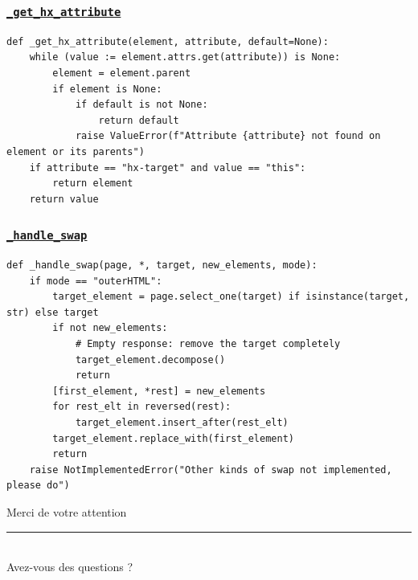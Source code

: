 \documentclass{beamer}
\begin{document}
\begin{frame}[fragile]
    \frametitle{\href{https://github.com/gip-inclusion/les-emplois/blob/9d800e6b3c8a814f17303157966830a0411db8e5/tests/utils/htmx/test.py\#L52}{\texttt{\_get\_hx\_attribute}}}
    \begin{verbatim}
def _get_hx_attribute(element, attribute, default=None):
    while (value := element.attrs.get(attribute)) is None:
        element = element.parent
        if element is None:
            if default is not None:
                return default
            raise ValueError(f"Attribute {attribute} not found on element or its parents")
    if attribute == "hx-target" and value == "this":
        return element
    return value
    \end{verbatim}
\end{frame}

\begin{frame}[fragile]
    \frametitle{\href{https://github.com/gip-inclusion/les-emplois/blob/9d800e6b3c8a814f17303157966830a0411db8e5/tests/utils/htmx/test.py\#L37}{\texttt{\_handle\_swap}}}
    \begin{verbatim}
def _handle_swap(page, *, target, new_elements, mode):
    if mode == "outerHTML":
        target_element = page.select_one(target) if isinstance(target, str) else target
        if not new_elements:
            # Empty response: remove the target completely
            target_element.decompose()
            return
        [first_element, *rest] = new_elements
        for rest_elt in reversed(rest):
            target_element.insert_after(rest_elt)
        target_element.replace_with(first_element)
        return
    raise NotImplementedError("Other kinds of swap not implemented, please do")
    \end{verbatim}
\end{frame}

\begin{frame}[focus]
    Merci de votre attention
    \\
    \vspace{20pt}
    \rule{\textwidth}{1pt}
    \\
    \vspace{30pt}
    Avez-vous des questions ?
\end{frame}
\end{document}
